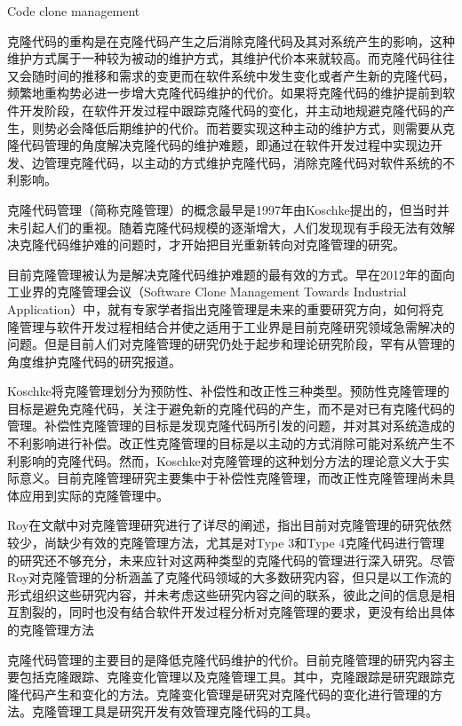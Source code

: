 {Code clone management}

克隆代码的重构是在克隆代码产生之后消除克隆代码及其对系统产生的影响，这种维护方式属于一种较为被动的维护方式，其维护代价本来就较高。而克隆代码往往又会随时间的推移和需求的变更而在软件系统中发生变化或者产生新的克隆代码，频繁地重构势必进一步增大克隆代码维护的代价。如果将克隆代码的维护提前到软件开发阶段，在软件开发过程中跟踪克隆代码的变化，并主动地规避克隆代码的产生，则势必会降低后期维护的代价。而若要实现这种主动的维护方式，则需要从克隆代码管理的角度解决克隆代码的维护难题，即通过在软件开发过程中实现边开发、边管理克隆代码，以主动的方式维护克隆代码，消除克隆代码对软件系统的不利影响。

克隆代码管理（简称克隆管理）的概念最早是1997年由Koschke提出的\cite{koschke2008frontiers}，但当时并未引起人们的重视。随着克隆代码规模的逐渐增大，人们发现现有手段无法有效解决克隆代码维护难的问题时，才开始把目光重新转向对克隆管理的研究。

目前克隆管理被认为是解决克隆代码维护难题的最有效的方式。早在2012年的面向工业界的克隆管理会议（Software Clone Management Towards Industrial Application）中，就有专家学者指出克隆管理是未来的重要研究方向，如何将克隆管理与软件开发过程相结合并使之适用于工业界是目前克隆研究领域急需解决的问题\cite{koschke2012software}。但是目前人们对克隆管理的研究仍处于起步和理论研究阶段，罕有从管理的角度维护克隆代码的研究报道。

Koschke将克隆管理划分为预防性、补偿性和改正性三种类型\cite{koschke2008frontiers}。预防性克隆管理的目标是避免克隆代码，关注于避免新的克隆代码的产生，而不是对已有克隆代码的管理。补偿性克隆管理的目标是发现克隆代码所引发的问题，并对其对系统造成的不利影响进行补偿。改正性克隆管理的目标是以主动的方式消除可能对系统产生不利影响的克隆代码。然而，Koschke对克隆管理的这种划分方法的理论意义大于实际意义。目前克隆管理研究主要集中于补偿性克隆管理，而改正性克隆管理尚未具体应用到实际的克隆管理中。

Roy在文献\cite{roy2014vision}中对克隆管理研究进行了详尽的阐述，指出目前对克隆管理的研究依然较少，尚缺少有效的克隆管理方法，尤其是对Type 3和Type 4克隆代码进行管理的研究还不够充分，未来应针对这两种类型的克隆代码的管理进行深入研究。尽管Roy对克隆管理的分析涵盖了克隆代码领域的大多数研究内容，但只是以工作流的形式组织这些研究内容，并未考虑这些研究内容之间的联系，彼此之间的信息是相互割裂的，同时也没有结合软件开发过程分析对克隆管理的要求，更没有给出具体的克隆管理方法

克隆代码管理的主要目的是降低克隆代码维护的代价。目前克隆管理的研究内容主要包括克隆跟踪、克隆变化管理以及克隆管理工具。其中，克隆跟踪是研究跟踪克隆代码产生和变化的方法。克隆变化管理是研究对克隆代码的变化进行管理的方法。克隆管理工具是研究开发有效管理克隆代码的工具。

